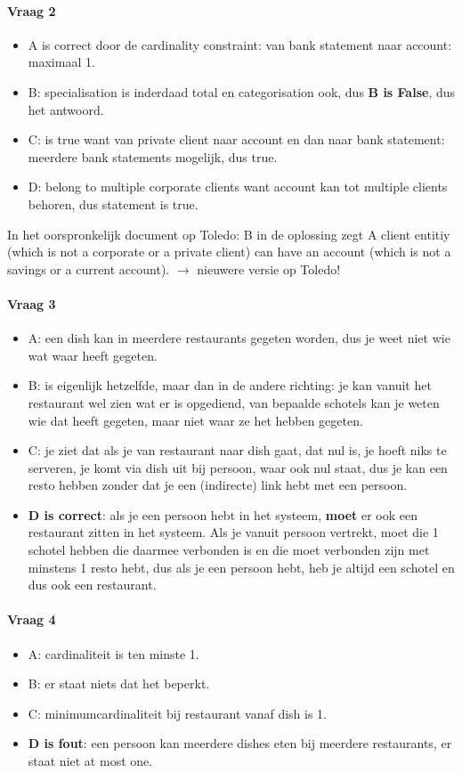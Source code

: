 \documentclass[10pt,a4paper]{report}
\begin{document}
\paragraph{Vraag 2}
\begin{itemize}
\item A is correct door de cardinality constraint: van bank statement naar account: maximaal 1.
\item B: specialisation is inderdaad total en categorisation ook, dus \textbf{B is False}, dus het antwoord. 
\item C: is true want van private client naar account en dan naar bank statement: meerdere bank statements mogelijk, dus true.
\item D: belong to multiple corporate clients want account kan tot multiple clients behoren, dus statement is true.
\end{itemize}
In het oorspronkelijk document op Toledo: 
B in de oplossing zegt A client entitiy (which is not a corporate or a private client) can have an account (which is not a savings or a current account).
$\rightarrow$ nieuwere versie op Toledo!

\paragraph{Vraag 3}
\begin{itemize}
\item A: een dish kan in meerdere restaurants gegeten worden, dus je weet niet wie wat waar heeft gegeten.
\item B: is eigenlijk hetzelfde, maar dan in de andere richting: je kan vanuit het restaurant wel zien wat er is opgediend, van bepaalde schotels kan je weten wie dat heeft gegeten, maar niet waar ze het hebben gegeten.
\item C: je ziet dat als je van restaurant naar dish gaat, dat nul is, je hoeft niks te serveren, je komt via dish uit bij persoon, waar ook nul staat, dus je kan een resto hebben zonder dat je een (indirecte) link hebt met een persoon.
\item \textbf{D is correct}: als je een persoon hebt in het systeem, \textbf{moet} er ook een restaurant zitten in het systeem. Als je vanuit persoon vertrekt, moet die 1 schotel hebben die daarmee verbonden is en die moet verbonden zijn met minstens 1 resto hebt, dus als je een persoon hebt, heb je altijd een schotel en dus ook een restaurant.
\end{itemize}

\paragraph{Vraag 4}
\begin{itemize}
\item A: cardinaliteit is ten minste 1.
\item B: er staat niets dat het beperkt.
\item C: minimumcardinaliteit bij restaurant vanaf dish is 1.
\item \textbf{D is fout}: een persoon kan meerdere dishes eten bij meerdere restaurants, er staat niet at most one.
\end{itemize}
\end{document}
